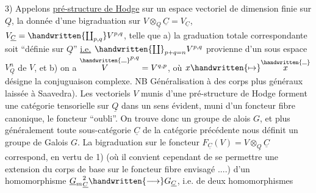 3) Appelons \uline{pré-structure de Hodge} sur un espace vectoriel  de dimension finie sur $\underline{Q}$, la donnée d'une bigraduation sur $V\otimes_{\underline{Q}}\underline{C}=V_{\underline{C}}$, $V_{\underline{C}}=\handwritten{\coprod_{p,q}}V^{p,q}$, telle que a) la graduation totale correspondante soit ``définie sur $\underline{Q}$'' \uline{i.e.} $\handwritten{\coprod}_{p+q=n}V^{p,q}$ provienne d'un sous espace $V_{\underline{Q}}^n$ de $V$, et b) on a $\overset{\handwritten{\rule{.65em}{.35pt}}}{V}^{p,q}=V^{q,p}$, où $x\handwritten{\mapsto}\overset{\handwritten{\rule{.55em}{.35pt}}}{x}$ désigne la conjuguaison complexe. \unsure{(}NB Généralisation à des corps plus généraux laissée à Saavedra). Les vectoriels $V$ munis d'une pré-structure de Hodge forment une catégorie tensorielle sur $\underline{Q}$ dans un sens évident, muni d'un foncteur fibre canonique, le foncteur ``oubli''. On trouve donc un groupe de alois $G$, et  plus généralement toute sous-catégorie $\underline{C}$ de la catégorie précédente nous définit un groupe de Galois $G$. La bigraduation sur le foncteur  $F_{\underline{C}}(V)=V\otimes_{\underline{Q}}\underline{C}$ correspond, en vertu de 1) (où il convient cependant de se permettre une extension du corps de base sur le foncteur fibre envisagé ....) d'un homomorphisme ${\underline{G}_m}_{\underline{C}}^2\handwritten{\longrightarrow}G_{\underline{C}}$, i.e. de deux homomorphismes 
